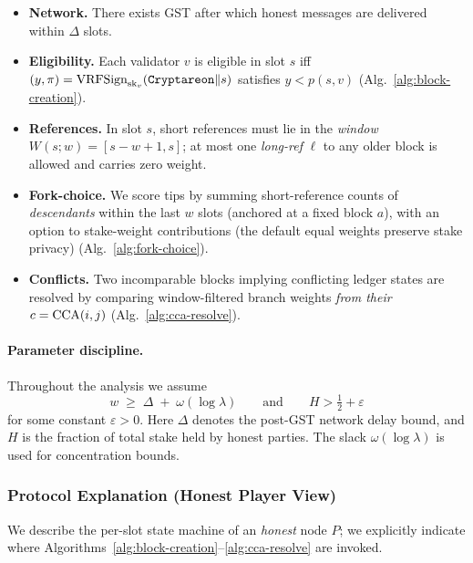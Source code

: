 \begin{itemize}
  \item \textbf{Network.} There exists GST after which honest messages are delivered within $\Delta$ slots.
  \item \textbf{Eligibility.} Each validator $v$ is eligible in slot $s$ iff $(y,\pi)=\mathrm{VRFSign}_{\mathrm{sk}_v}(\mathtt{Cryptareon}\|s)$ satisfies $y<p(s,v)$ (Alg.~\ref{alg:block-creation}).
  \item \textbf{References.} In slot $s$, short references must lie in the \emph{window} $W(s;w)=[s-w+1,s]$; at most one \emph{long-ref} $\ell$ to any older block is allowed and carries zero weight.
  \item \textbf{Fork-choice.} We score tips by summing short-reference counts of \emph{descendants} within the last $w$ slots (anchored at a fixed block $a$), with an option to stake-weight contributions (the default equal weights preserve stake privacy) (Alg.~\ref{alg:fork-choice}).
  \item \textbf{Conflicts.} Two incomparable blocks implying conflicting ledger states are resolved by comparing window-filtered branch weights \emph{from their} $c=\mathrm{CCA}(i,j)$ (Alg.~\ref{alg:cca-resolve}).
\end{itemize}

\paragraph{Parameter discipline.} Throughout the analysis we assume
\begin{equation}
\label{eq:base-params}
w \;\ge\; \Delta \;+\; \omega(\log\lambda) \qquad\text{and}\qquad 
H>\tfrac{1}{2}+\varepsilon
\end{equation}
for some constant $\varepsilon>0$. Here $\Delta$ denotes the post-GST network delay bound, and $H$ is the fraction of total stake held by honest parties. The slack $\omega(\log\lambda)$ is used for concentration bounds.

\subsubsection{Protocol Explanation (Honest Player View)}
\label{subsec:base-walkthrough}
We describe the per-slot state machine of an \emph{honest} node $P$; we explicitly indicate where Algorithms~\ref{alg:block-creation}–\ref{alg:cca-resolve} are invoked. 


